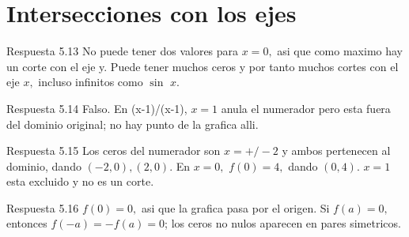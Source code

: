\documentclass[10pt,a4paper,oneside,openany]{book}
\begin{document}
\section{Intersecciones con los ejes}
\begin{PSevenAnswerFixed}{Respuesta 5.13}
No puede tener dos valores para \(x=0,\) asi que como maximo hay un corte con el eje y. Puede tener muchos ceros y por tanto muchos cortes con el eje \(x,\) incluso infinitos como \(\sin\) \(x\).
\end{PSevenAnswerFixed}
\begin{PSevenAnswerFixed}{Respuesta 5.14}
Falso. En (x-1)/(x-1), \(x=1\) anula el numerador pero esta fuera del dominio original; no hay punto de la grafica alli.
\end{PSevenAnswerFixed}
\begin{PSevenAnswerFixed}{Respuesta 5.15}
Los ceros del numerador son \(x=+/-2\) y ambos pertenecen al dominio, dando \((-2,0),(2,0)\). En \(x=0,\) \(f(0)=4,\) dando \((0,4)\). \(x=1\) esta excluido y no es un corte.
\end{PSevenAnswerFixed}
\begin{PSevenAnswerFixed}{Respuesta 5.16}
\(f(0)=0,\) asi que la grafica pasa por el origen. Si \(f(a)=0,\) entonces \(f(-a)=-f(a)=0\); los ceros no nulos aparecen en pares simetricos.
\end{PSevenAnswerFixed}
\end{document}
